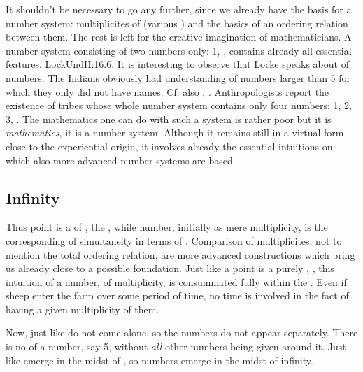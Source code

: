 \newp 

\pa It shouldn't be necessary to go any further, since we already have the basis
for a number system: multiplicites of  (various
) and the basics of an ordering relation between them.  The rest is
left for the creative imagination of mathematicians.  A number system consisting
of two numbers only: 1, , contains already all essential features.
\citet{The Tououpinambos [native Americans I have spoken with] had no names for
  numbers above 5; any number beyond that they made out by showing their
  fingers, and the fingers of others who were present.}{LockUnd}{II:16.6. It is
  interesting to observe that Locke speaks about  of numbers. The
  Indians obviously had understanding of numbers larger than 5 for which they
  only did not have names. Cf. also \citeauthor*{SavageMind},
  \citeauthor*{Hartner}.}  Anthropologists report the existence of tribes whose
whole number system contains only four numbers: 1, 2, 3, .  The
mathematics one can do with such a system is rather poor but it is {\em
  mathematics}, it is a number system.  Although it remains still in a virtual
form close to the experiential origin, it involves already the essential
intuitions on which also more advanced number systems are based.


\subsection{Infinity} %

\pa Thus point is a  of , the , while number, initially as mere multiplicity, is the corresponding
 of simultaneity in terms of .  Comparison
of multiplicites, not to mention the total ordering relation, are more advanced
constructions which bring us already close to a possible foundation. Just like a
point is a purely , , this intuition of a
number, of multiplicity, is consummated fully within the \hoa. Even if sheep
enter the farm over some period of time, no time is involved in the fact of
having a given multiplicity of them.

Now, just like  do not come alone, so the numbers do not appear
separately. There is no  of a number, say 5, without {\em all}
other numbers being given around it. Just like  emerge in the
midst of , so numbers emerge in the midst of infinity.

